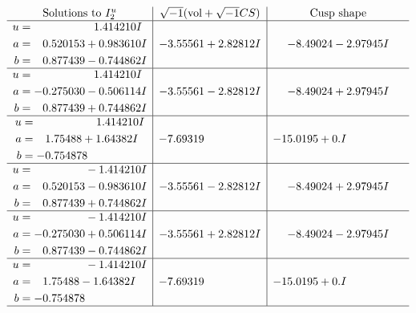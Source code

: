 \documentclass[1p]{elsarticle_modified}
\theoremstyle{definition}
\newcommand{\I}{\sqrt{-1}}
\begin{document}
$$\begin{array}{c|c|c}  
\text{Solutions to }I^u_{2}& \I (\text{vol} + \sqrt{-1}CS) & \text{Cusp shape}\\
 \hline 
\begin{aligned}
u &= \phantom{-0.000000 -}1.414210 I \\
a &= \phantom{-}0.520153 + 0.983610 I \\
b &= \phantom{-}0.877439 - 0.744862 I\end{aligned}
 & -3.55561 + 2.82812 I & -8.49024 - 2.97945 I \\ \hline\begin{aligned}
u &= \phantom{-0.000000 -}1.414210 I \\
a &= -0.275030 - 0.506114 I \\
b &= \phantom{-}0.877439 + 0.744862 I\end{aligned}
 & -3.55561 - 2.82812 I & -8.49024 + 2.97945 I \\ \hline\begin{aligned}
u &= \phantom{-0.000000 -}1.414210 I \\
a &= \phantom{-}1.75488 + 1.64382 I \\
b &= -0.754878\phantom{ +0.000000I}\end{aligned}
 & -7.69319\phantom{ +0.000000I} & -15.0195 + 0. I\phantom{ +0.000000I} \\ \hline\begin{aligned}
u &= \phantom{-0.000000 } -1.414210 I \\
a &= \phantom{-}0.520153 - 0.983610 I \\
b &= \phantom{-}0.877439 + 0.744862 I\end{aligned}
 & -3.55561 - 2.82812 I & -8.49024 + 2.97945 I \\ \hline\begin{aligned}
u &= \phantom{-0.000000 } -1.414210 I \\
a &= -0.275030 + 0.506114 I \\
b &= \phantom{-}0.877439 - 0.744862 I\end{aligned}
 & -3.55561 + 2.82812 I & -8.49024 - 2.97945 I \\ \hline\begin{aligned}
u &= \phantom{-0.000000 } -1.414210 I \\
a &= \phantom{-}1.75488 - 1.64382 I \\
b &= -0.754878\phantom{ +0.000000I}\end{aligned}
 & -7.69319\phantom{ +0.000000I} & -15.0195 + 0. I\phantom{ +0.000000I}\\
 \hline 
 \end{array}$$\newpage\newpage\renewcommand{\arraystretch}{1}
\end{document}
